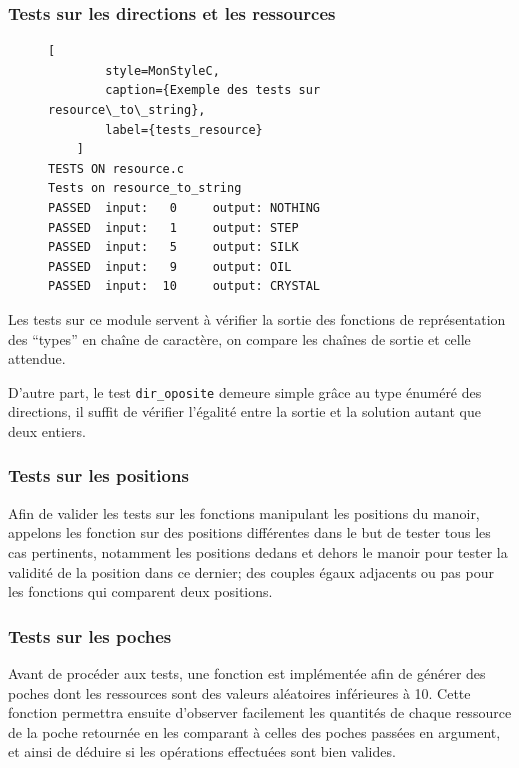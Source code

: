 \subsubsection{Tests sur les directions et les ressources}

\begin{figure}[H]
    \centering
    \captionsetup[lstlisting]{name=Figure}
    \begin{lstlisting}[
        style=MonStyleC,
        caption={Exemple des tests sur resource\_to\_string},
        label={tests_resource}
    ]
TESTS ON resource.c
Tests on resource_to_string 
PASSED  input:   0     output: NOTHING
PASSED  input:   1     output: STEP
PASSED  input:   5     output: SILK
PASSED  input:   9     output: OIL
PASSED  input:  10     output: CRYSTAL
    \end{lstlisting}
\end{figure}

Les tests sur ce module servent à vérifier la sortie des fonctions de représentation des “types” en chaîne de caractère, on compare les chaînes de sortie et celle attendue.

D'autre part, le test \texttt{dir\_oposite} demeure simple grâce au type énuméré des directions, il suffit de vérifier l'égalité entre la sortie et la solution autant que deux entiers.

\subsubsection{Tests sur les positions}

Afin de valider les tests sur les fonctions manipulant les positions du manoir, appelons les fonction sur des positions différentes dans le but de tester tous les cas pertinents, notamment les positions dedans et dehors le manoir pour tester la validité de la position dans ce dernier; des couples égaux adjacents ou pas pour les fonctions qui comparent deux positions.

\subsubsection{Tests sur les poches}

Avant de procéder aux tests, une fonction est implémentée afin de générer des poches dont les ressources sont des valeurs aléatoires inférieures à 10. Cette fonction permettra ensuite d'observer facilement les quantités de chaque ressource de la poche retournée en les comparant à celles des poches passées en argument, et ainsi de déduire si les opérations effectuées sont bien valides.


